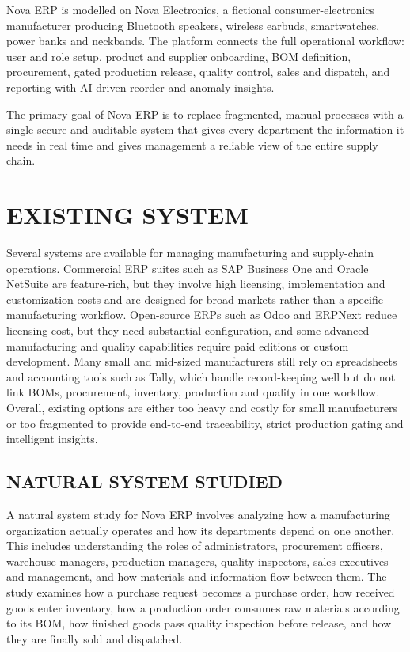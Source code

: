 \documentclass[12pt,a4paper]{report}
\begin{document}
Nova ERP is modelled on Nova Electronics, a fictional consumer-electronics manufacturer producing Bluetooth speakers, wireless earbuds, smartwatches, power banks and neckbands. The platform connects the full operational workflow: user and role setup, product and supplier onboarding, BOM definition, procurement, gated production release, quality control, sales and dispatch, and reporting with AI-driven reorder and anomaly insights.

The primary goal of Nova ERP is to replace fragmented, manual processes with a single secure and auditable system that gives every department the information it needs in real time and gives management a reliable view of the entire supply chain.

\section{EXISTING SYSTEM}
Several systems are available for managing manufacturing and supply-chain operations. Commercial ERP suites such as SAP Business One and Oracle NetSuite are feature-rich, but they involve high licensing, implementation and customization costs and are designed for broad markets rather than a specific manufacturing workflow. Open-source ERPs such as Odoo and ERPNext reduce licensing cost, but they need substantial configuration, and some advanced manufacturing and quality capabilities require paid editions or custom development. Many small and mid-sized manufacturers still rely on spreadsheets and accounting tools such as Tally, which handle record-keeping well but do not link BOMs, procurement, inventory, production and quality in one workflow. Overall, existing options are either too heavy and costly for small manufacturers or too fragmented to provide end-to-end traceability, strict production gating and intelligent insights.

\subsection{NATURAL SYSTEM STUDIED}
A natural system study for Nova ERP involves analyzing how a manufacturing organization actually operates and how its departments depend on one another. This includes understanding the roles of administrators, procurement officers, warehouse managers, production managers, quality inspectors, sales executives and management, and how materials and information flow between them. The study examines how a purchase request becomes a purchase order, how received goods enter inventory, how a production order consumes raw materials according to its BOM, how finished goods pass quality inspection before release, and how they are finally sold and dispatched.
\end{document}
